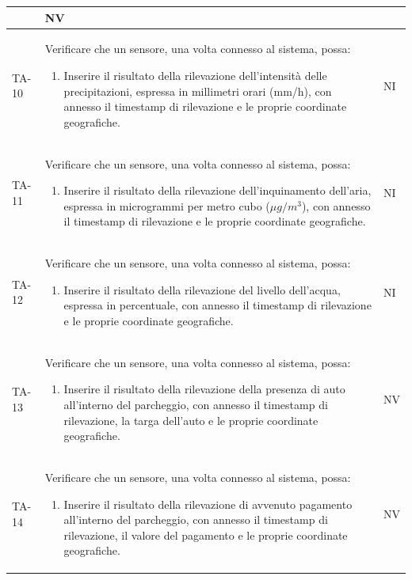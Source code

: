 \documentclass[8pt]{article}
\begin{document}
\begin{longtable}{|>{\centering}p{2cm}|>{\RaggedRight}m{12cm}|>{\centering\arraybackslash}p{2cm}|}
\begin{enumerate}
    \end{enumerate}
    & NV \\
    \hline
    TA-10 &
    Verificare che un sensore, una volta connesso al sistema, possa:
    \begin{enumerate}
    \item Inserire il risultato della rilevazione dell'intensità delle precipitazioni, espressa in millimetri orari (mm/h), con annesso il timestamp di rilevazione e le proprie coordinate geografiche.
    \end{enumerate}
    & NI \\
    \hline
    TA-11 &
    Verificare che un sensore, una volta connesso al sistema, possa:
    \begin{enumerate}
    \item Inserire il risultato della rilevazione dell’inquinamento dell'aria, espressa in microgrammi per metro cubo ($\mu g / m^3$), con annesso il timestamp di rilevazione e le proprie coordinate geografiche.
    \end{enumerate}
    & NI \\
    \hline
    TA-12 &
    Verificare che un sensore, una volta connesso al sistema, possa:
    \begin{enumerate}
    \item Inserire il risultato della rilevazione del livello dell'acqua, espressa in percentuale, con annesso il timestamp di rilevazione e le proprie coordinate geografiche.
    \end{enumerate}
    & NI \\
    \hline
    TA-13 &
    Verificare che un sensore, una volta connesso al sistema, possa:
    \begin{enumerate}
    \item  Inserire il risultato della rilevazione della presenza di auto all’interno del
        parcheggio, con annesso il timestamp di rilevazione, la targa dell'auto e le proprie coordinate geografiche. 
    \end{enumerate}
    & NV \\
    \hline
    TA-14 &
    Verificare che un sensore, una volta connesso al sistema, possa:
    \begin{enumerate}
    \item Inserire il risultato della rilevazione di avvenuto pagamento all’interno del
        parcheggio, con annesso il timestamp di rilevazione, il valore del pagamento e le proprie coordinate geografiche. 
    \end{enumerate}
    & NV \\

\end{longtable}
\end{document}
